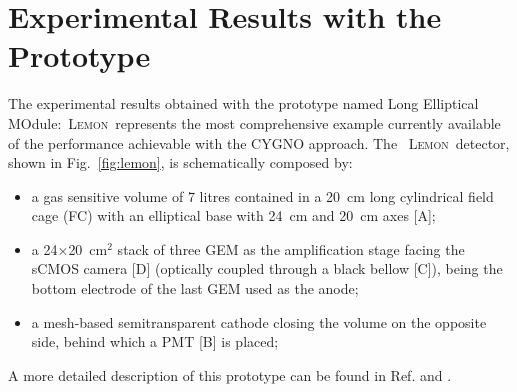 \documentclass[physics,article,submit,moreauthors,pdftex]{Definitions/mdpi}
\newcommand{\lemon}{{\textsc{Lemon}}\xspace}
\begin{document}






\section{Experimental Results with the Prototype}\label{sec:results}
The experimental results obtained with the prototype named Long Elliptical MOdule:~\lemon\ represents the most comprehensive example currently available of the performance achievable with the CYGNO approach.
The ~\lemon\ detector,  shown in Fig.~\ref{fig:lemon}, is schematically composed by:
\begin{itemize}
    \item a gas sensitive volume of 7 litres contained in a 20~cm long cylindrical field cage (FC) with an elliptical base with 24~cm and 20~cm axes [A];
    \item a 24$\times$20~cm$^2$ stack of three GEM as the amplification stage  facing the sCMOS camera [D] (optically coupled through a black bellow [C]), being the bottom electrode of the last GEM used as the anode; 
   \item a mesh-based semitransparent cathode closing the volume on the opposite side, behind which a PMT [B] is placed;
\end{itemize}
A more detailed description of this prototype can be found in Ref.\cite{bib:fe55} and \cite{bib:lemon_btf}.
\end{document}
